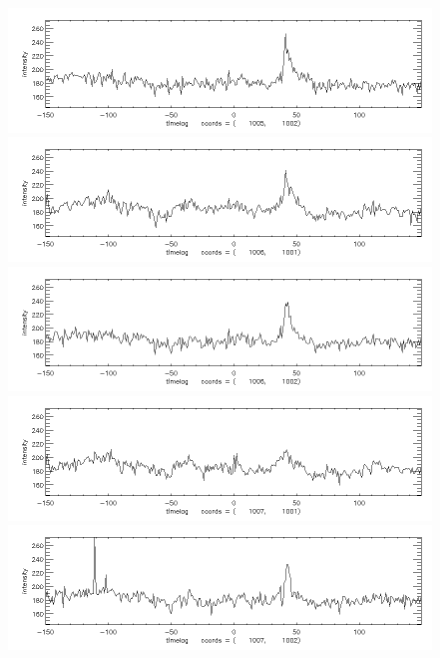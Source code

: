 \documentclass[12pt]{article}
\begin{document}
\begin{figure}[here]
\includegraphics[width=7in]{lc36.png}
\includegraphics[width=7in]{lc37.png}
\includegraphics[width=7in]{lc38.png}
\includegraphics[width=7in]{lc39.png}
\includegraphics[width=7in]{lc40.png}
\end{figure}

\newpage
\end{document}
